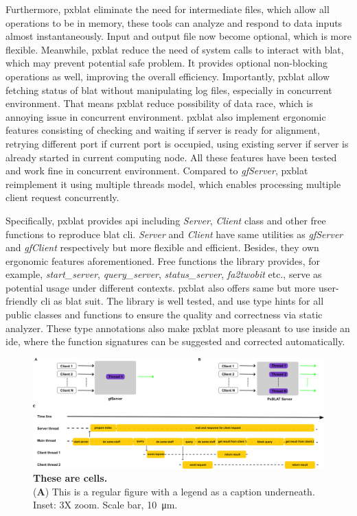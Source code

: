 Furthermore, \gls{pxblat} eliminate the need for intermediate files, which allow all operations to be in memory, these tools can analyze and respond to data inputs almost instantaneously.
Input and output file now become optional, which is more flexible.
Meanwhile, \gls{pxblat} reduce the need of system calls to interact with \gls{blat}, which may prevent potential safe problem.
It provides optional non-blocking operations as well, improving the overall efficiency.
Importantly, \gls{pxblat} allow fetching status of \gls{blat} without manipulating log files, especially in concurrent environment.
That means \gls{pxblat} reduce possibility of data race, which is annoying issue in concurrent environment.
\gls{pxblat} also implement ergonomic features consisting of checking and waiting if server is ready for alignment, retrying different port if current port is occupied, using existing server if server is already started in current computing node.
All these features have been tested and work fine in concurrent environment.
Compared to \emph{gfServer},  \gls{pxblat} reimplement it using multiple threads model, which enables processing multiple client request concurrently.

Specifically, \gls{pxblat} provides \gls{api} including  \emph{Server}, \emph{Client} class and other free functions to reproduce \gls{blat} \gls{cli}.
\emph{Server} and \emph{Client} have same utilities as \emph{gfServer} and \emph{gfClient} respectively but more flexible and efficient.
Besides, they own ergonomic features aforementioned.
Free functions the library provides, for example, \emph{start\_server}, \emph{query\_server}, \emph{status\_server}, \emph{fa2twobit} etc., serve as potential usage under different contexts.
\gls{pxblat} also offers same but more user-friendly \gls{cli} as \gls{blat} suit.
The library is well tested, and use type hints for all public classes and functions to ensure the quality and correctness via static analyzer.
These type annotations also make \gls{pxblat} more pleasant to use inside an \gls{ide}, where the function signatures can be suggested and corrected automatically.

\begin{figure}
	\centering
	\includegraphics[width=0.75\linewidth]{figures/pxblat.png}
	\caption{\textbf{These are cells.}\\
		(\textbf{A}) This is a regular figure with a legend as a caption underneath. Inset: 3X zoom. Scale bar, \SI{10}{\micro\meter}.}
	\label{fig:pxblat}
\end{figure}


